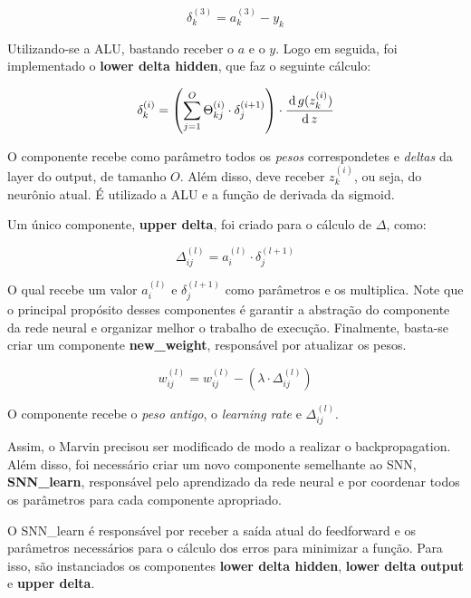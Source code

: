     \begin{equation}
        \delta^{(3)}_k = a^{(3)}_k - y_k
    \end{equation}

    Utilizando-se a ALU, bastando receber o $a$ e o $y$. Logo em seguida, foi implementado o \textbf{lower delta hidden}, que faz o seguinte cálculo:

    \begin{equation}
        \delta^{(i)}_k = \left(\sum_{j = 1}^O \Theta^{(i)}_{kj} \cdot \delta^{(i + 1)}_{j}\right) \cdot \cfrac{\operatorname{d} g(z^{(i)}_k)}{\operatorname{d} z}
    \end{equation}

    O componente recebe como parâmetro todos os \textit{pesos} correspondetes e \textit{deltas} da layer do output, de tamanho $O$. Além disso, deve receber $z^{(i)}_k$, ou seja, do neurônio atual. É utilizado a ALU e a função de derivada da sigmoid.

    Um único componente, \textbf{upper delta}, foi criado para o cálculo de $\Delta$, como:

    \begin{equation}
        \Delta^{(l)}_{ij} = a^{(l)}_i \cdot \delta^{(l + 1)}_j
    \end{equation}

    O qual recebe um valor $a^{(l)}_i$ e $\delta^{(l + 1)}_j$ como parâmetros e os multiplica. Note que o principal propósito desses componentes é garantir a abstração do componente da rede neural e organizar melhor o trabalho de execução. Finalmente, basta-se criar um componente \textbf{new\_weight}, responsável por atualizar os pesos.

    \begin{equation}
        w^{(l)}_{ij} = w^{(l)}_{ij} - (\lambda \cdot \Delta^{(l)}_{ij})
    \end{equation}

    O componente recebe o \textit{peso antigo}, o \textit{learning rate} e $\Delta^{(l)}_{ij}$.

    Assim, o Marvin precisou ser modificado de modo a realizar o backpropagation. Além disso, foi necessário criar um novo componente semelhante ao SNN, \textbf{SNN\_learn}, responsável pelo aprendizado da rede neural e por coordenar todos os parâmetros para cada componente apropriado.

    O SNN\_learn é responsável por receber a saída atual do feedforward e os parâmetros necessários para o cálculo dos erros para minimizar a função. Para isso, são instanciados os componentes  \textbf{lower delta hidden}, \textbf{lower delta output} e \textbf{upper delta}.

